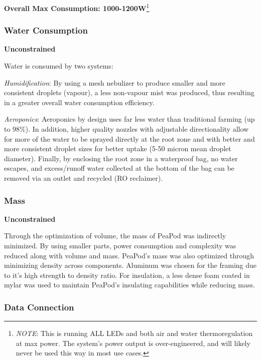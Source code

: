 \documentclass{report}
\begin{document}
\textbf{Overall Max Consumption: 1000-1200W}\footnote{\textit{NOTE}: This is running ALL LEDs and both air and water thermoregulation at max power. The system's power output is over-engineered, and will likely never be used this way in most use cases.}
\newpage


\subsubsection{Water Consumption}
\label{sec:constraints-water}

\textbf{Unconstrained}


Water is consumed by two systems:

\textit{Humidification}: By using a mesh nebulizer to produce smaller and more consistent droplets (vapour), a less non-vapour mist was produced, thus resulting in a greater overall water consumption efficiency.

\textit{Aeroponics}: Aeroponics by design uses far less water than traditional farming (up to 98\%). In addition, higher quality nozzles with adjustable directionality allow for more of the water to be sprayed directly at the root zone and with better and more consistent droplet sizes for better uptake (5-50 micron mean droplet diameter). Finally, by enclosing the root zone in a waterproof bag, no water escapes, and excess/runoff water collected at the bottom of the bag can be removed via an outlet and recycled (RO reclaimer).

\subsubsection{Mass} 
\label{sec:constraints-mass}

\textbf{Unconstrained}

Through the optimization of volume, the mass of PeaPod was indirectly minimized. By using smaller parts, power consumption and complexity was reduced along with volume and mass. PeaPod's mass was also optimized through minimizing density across components. Aluminum was chosen for the framing due to it's high strength to density ratio. For insulation, a less dense foam coated in mylar was used to maintain PeaPod's insulating capabilities while reducing mass.


\subsubsection{Data Connection} 
\label{sec:constraints-data}
\end{document}
